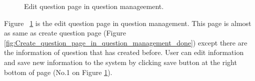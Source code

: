 \documentclass[12pt,oneside,openright,a4paper]{cpe-english-project}
\begin{document}
		\begin{figure}[!h]\centering
			\caption{Edit question page in question manageement.}\label{fig:Edit_question_page_in_question_manageement_done}
		\end{figure}
		\begin{flushleft}
			Figure ~\ref*{fig:Edit_question_page_in_question_manageement_done} is the edit question page in question management. This page is almost as same as create question page (Figure \ref*{fig:Create_question_page_in_question_management_done}) except there are the information of question that has created before. User can edit information and save new information to the system by clicking save button at the right bottom of page (No.1 on Figure \ref*{fig:Edit_question_page_in_question_manageement_done}).
		\end{flushleft}
\end{document}
